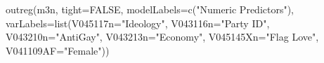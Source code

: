 \begin{Schunk}
\begin{Sinput}
 outreg(m3n, tight=FALSE, modelLabels=c("Numeric Predictors"), varLabels=list(V045117n="Ideology", V043116n="Party ID", V043210n="AntiGay", V043213n="Economy", V045145Xn="Flag Love", V041109AF="Female"))
\end{Sinput}
\end{Schunk}
